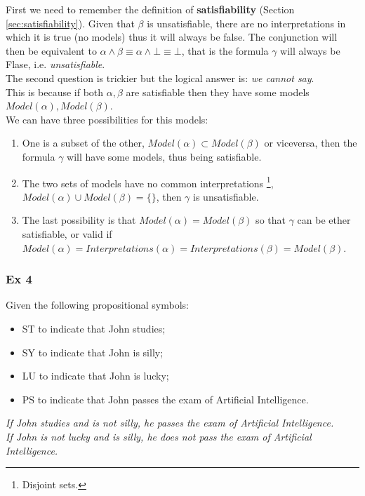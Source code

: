 \documentclass[10pt,a4paper]{article}
\begin{document}
\begin{itemize}
First we need to remember the definition of \textbf{satisfiability} (Section \ref{sec:satisfiability}). Given that $\beta$ is unsatisfiable, there are no interpretations in which it is true (no models) thus it will always be false. The conjunction will then be equivalent to $\alpha \wedge\beta \equiv \alpha \wedge \bot\equiv \bot$, that is the formula $\gamma$ will always be Flase, i.e. \textit{unsatisfiable}.\\
The second question is trickier but the logical answer is: \textit{we cannot say}.\\
This is because if both $\alpha,\beta$ are satisfiable then they have some models $Model(\alpha),Model(\beta)$.\\ 
We can have three possibilities for this models:
\begin{enumerate}
\item One is a subset of the other, $Model(\alpha)\subset Model(\beta)$ or viceversa, then the formula  $\gamma$ will have some models, thus being satisfiable.
\item The two sets of models have no common interpretations \footnote{Disjoint sets.}, $Model(\alpha)\cup Model(\beta)=\{\}$, then $\gamma$ is unsatisfiable.
\item The last possibility is that  $Model(\alpha)= Model(\beta)$ so that $\gamma$ can be ether satisfiable, or valid if $Model(\alpha)=Interpretations(\alpha)=Interpretations(\beta)=Model(\beta)$.
\end{enumerate}

\subsubsection{Ex 4}
Given the following propositional symbols:
\begin{itemize}
\item ST to indicate that John studies;
\item SY to indicate that John is silly;
\item LU to indicate that John is lucky;
\item PS to indicate that John passes the exam of Artificial Intelligence.
\end{itemize}
\begin{center}
\textit{If John studies and is not silly, he passes the exam of Artificial Intelligence.\\
If John is not lucky and is silly, he does not pass the exam of Artificial Intelligence.}
\end{center}


\end{itemize}
\end{document}
